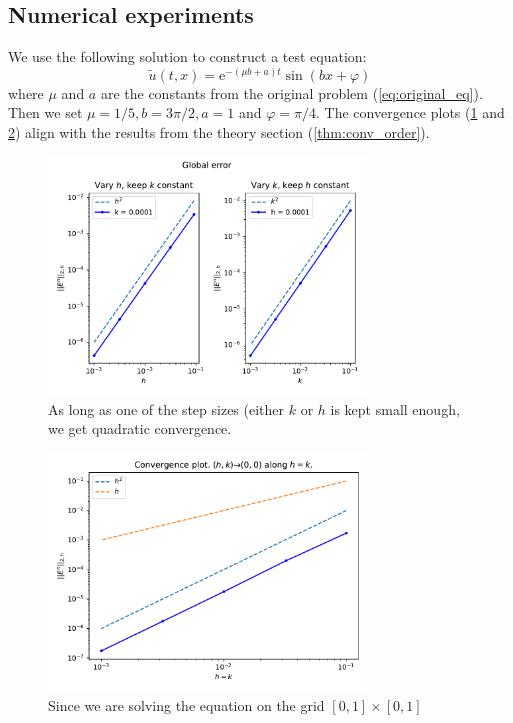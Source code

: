 \subsection{Numerical experiments}
We use the following solution to construct a test equation:
\begin{equation}
  \tilde{u}(t, x) = \text{e}^{-(\mu b + a)t} \sin (bx + \varphi)
\end{equation}
where \( \mu  \) and \( a \) are the constants from the original problem
(\eqref{eq:original_eq}).
Then we set \( \mu = 1/5, b = 3\pi/2, a = 1 \) and \( \varphi = \pi/4 \).
The convergence plots (\ref{fig:conv_plot1} and \ref{fig:conv_plot2})
align with the results from the theory section (\ref{thm:conv_order}).
\begin{figure}[!h]
    \centering
    \includegraphics[width=0.75\textwidth]{Images/plots/task1_err1.pdf}
    \caption{As long as one of the step sizes (either \( k\) or \( h \)
      is kept small enough, we get quadratic convergence.}
    \label{fig:conv_plot1}
\end{figure}
\begin{figure}[!h]
    \centering
    \includegraphics[width=0.75\textwidth]{Images/plots/task1_err2.pdf}
    \caption{Since we are solving the equation on the grid 
      \( [0,1] \times [0,1] \) 
    }
    \label{fig:conv_plot2}
\end{figure}
